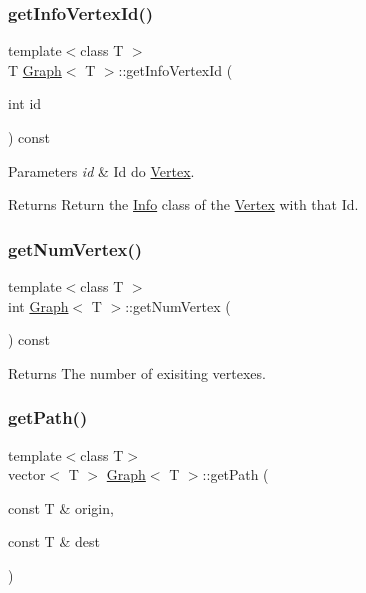 \subsubsection{\texorpdfstring{get\+Info\+Vertex\+Id()}{getInfoVertexId()}}
{\footnotesize\ttfamily template$<$class T $>$ \\
T \hyperlink{class_graph}{Graph}$<$ T $>$\+::get\+Info\+Vertex\+Id (\begin{DoxyParamCaption}\item[{int}]{id }\end{DoxyParamCaption}) const}


\begin{DoxyParams}{Parameters}
{\em id} & Id do \hyperlink{class_vertex}{Vertex}.\\
\hline
\end{DoxyParams}
\begin{DoxyReturn}{Returns}
Return the \hyperlink{class_info}{Info} class of the \hyperlink{class_vertex}{Vertex} with that Id. 
\end{DoxyReturn}
\mbox{\label{class_graph_a0853eac15cdf0f06d63f4b8a7820ec71}} 
\subsubsection{\texorpdfstring{get\+Num\+Vertex()}{getNumVertex()}}
{\footnotesize\ttfamily template$<$class T $>$ \\
int \hyperlink{class_graph}{Graph}$<$ T $>$\+::get\+Num\+Vertex (\begin{DoxyParamCaption}{ }\end{DoxyParamCaption}) const}

\begin{DoxyReturn}{Returns}
The number of exisiting vertexes. 
\end{DoxyReturn}
\mbox{\label{class_graph_ab4054ca572c10669dd3e05d6d41c116c}} 
\subsubsection{\texorpdfstring{get\+Path()}{getPath()}}
{\footnotesize\ttfamily template$<$class T$>$ \\
vector$<$ T $>$ \hyperlink{class_graph}{Graph}$<$ T $>$\+::get\+Path (\begin{DoxyParamCaption}\item[{const T \&}]{origin,  }\item[{const T \&}]{dest }\end{DoxyParamCaption})}


